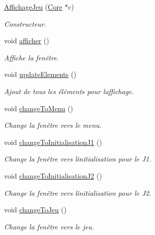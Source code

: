 \begin{DoxyCompactItemize}
\item 
\hyperlink{class_affichage_jeu_a2aadf21ada8d8a8d2af275842e9fbda2}{Affichage\+Jeu} (\hyperlink{class_core}{Core} $\ast$c)
\begin{DoxyCompactList}\small\item\em Constructeur. \end{DoxyCompactList}\item 
void \hyperlink{class_affichage_jeu_a29d9ad7ef0161faa698bd0850efbb1fc}{afficher} ()
\begin{DoxyCompactList}\small\item\em Affiche la fenêtre. \end{DoxyCompactList}\item 
void \hyperlink{class_affichage_jeu_ad17e5eea2e70c327f085b6e0ed9330e4}{update\+Elements} ()
\begin{DoxyCompactList}\small\item\em Ajout de tous les éléments pour l\textquotesingle{}affichage. \end{DoxyCompactList}\item 
void \hyperlink{class_affichage_jeu_aa0fe30f907b9c0c2007466d287c701fd}{change\+To\+Menu} ()
\begin{DoxyCompactList}\small\item\em Change la fenêtre vers le menu. \end{DoxyCompactList}\item 
void \hyperlink{class_affichage_jeu_a4e8693c20861bc9e79e0c0037ba4ffa8}{change\+To\+Initialisation\+J1} ()
\begin{DoxyCompactList}\small\item\em Change la fenêtre vers l\textquotesingle{}initialisation pour le J1. \end{DoxyCompactList}\item 
void \hyperlink{class_affichage_jeu_a62db45f512fb855b096bcfd19e379429}{change\+To\+Initialisation\+J2} ()
\begin{DoxyCompactList}\small\item\em Change la fenêtre vers l\textquotesingle{}initialisation pour le J2. \end{DoxyCompactList}\item 
void \hyperlink{class_affichage_jeu_aec00eea36f08e0bd187832d17ec32680}{change\+To\+Jeu} ()
\begin{DoxyCompactList}\small\item\em Change la fenêtre vers le jeu. \end{DoxyCompactList}\item 

\end{DoxyCompactItemize}
